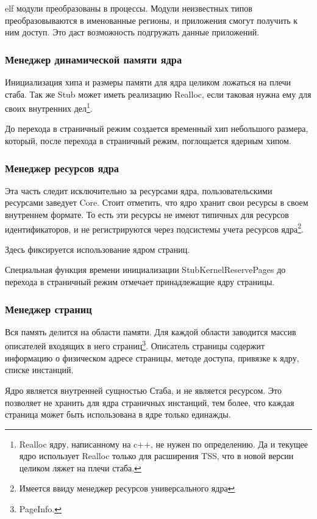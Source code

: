 elf модули преобразованы в процессы. Модули неизвестных типов преобразовываются
в именованные регионы, и приложения смогут получить к ним доступ. Это даст
возможность подгружать данные приложений.

\subsubsection{Менеджер динамической памяти ядра}

Инициализация хипа и размеры памяти для ядра целиком ложаться на плечи стаба.
Так же Stub может иметь реализацию Realloc, если таковая нужна ему для своих
внутренних дел\footnote{Realloc ядру, написанному на c++, не нужен по
определению. Да и текущее ядро использует Realloc только для расширения TSS, что
в новой версии целиком ляжет на плечи стаба.}.

До перехода в страничный режим создается временный хип небольшого размера,
который, после перехода в страничный режим, поглощается ядерным хипом.

\subsubsection{Менеджер ресурсов ядра}

Эта часть следит исключительно за ресурсами ядра, пользовательскими ресурсами
заведует Core. Стоит отметить, что ядро хранит свои ресурсы в своем внутреннем
формате. То есть эти ресурсы не имеют типичных для ресурсов идентификаторов, и
не регистрируются через подсистемы учета ресурсов ядра\footnote{Имеется ввиду
менеджер ресурсов универсального ядра}.

Здесь фиксируется использование ядром страниц.

Специальная функция времени инициализации StubKernelReservePages до перехода в
страничный режим отмечает принадлежащие ядру страницы.

\subsubsection{Менеджер страниц}

Вся память делится на области памяти. Для каждой области заводится массив
описателей входящих в него страниц\footnote{PageInfo.}. Описатель страницы
содержит информацию о физическом адресе страницы, методе доступа, привязке к
ядру, списке инстанций.

Ядро является внутренней сущностью Стаба, и не является ресурсом. Это позволяет
не хранить для ядра страничных инстанций, тем более, что каждая страница может
быть использована в ядре только единажды.

